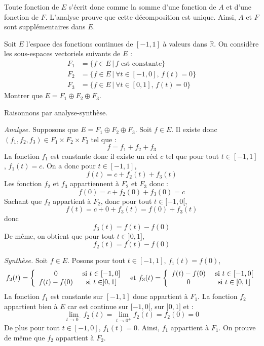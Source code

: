 \documentclass[a4paper,10pt]{report}
\begin{document}
\medskip

\noindent Toute fonction de $E$ s'écrit donc comme la somme d'une fonction de $A$ et d'une fonction de $F$. L'analyse prouve que cette décomposition est unique. Ainsi, $A$ et $F$ sont supplémentaires dans $E$.

\medskip



\begin{Exercice}{} Soit $E$ l'espace des fonctions continues de $[-1,1]$ à valeurs dans $\mathbb{R}$. On considère les sous-espaces vectoriels suivants de $E$ :
\begin{align*}
F_1 &= \lbrace f \in E \, \vert \, f{\text{~est constante}} \rbrace \\
F_2 &= \lbrace f \in E \, \vert \ \forall t \in [ - 1,0], \,  f(t)  = 0 \rbrace \\
F_3 & = \lbrace f \in E \, \vert \ \forall t \in [0,1], \,  f(t) = 0 \rbrace 
\end{align*}
Montrer que $E = F_1 \oplus F_2 \oplus F_3$.
\end{Exercice} 

\corr Raisonnons par analyse-synthèse.

\medskip

\noindent \textit{Analyse.} Supposons que $E = F_1 \oplus F_2 \oplus F_3$. Soit $f \in E$. Il existe donc $(f_1,f_2,f_3) \in F_1 \times F_2 \times F_3$ tel que :
$$ f = f_1+ f_2+ f_3$$
La fonction $f_1$ est constante donc il existe un réel $c$ tel que pour tout $t \in [-1,1]$, $f_1(t)=c$. On a donc pour $t \in [-1,1]$,
$$ f(t) = c + f_2(t) + f_3(t)$$
Les fonction $f_2$ et $f_3$ appartiennent à $F_2$ et $F_3$ donc :
$$ f(0) = c + f_2(0)+ f_3(0) = c$$
Sachant que $f_2$ appartient à $F_2$, donc pour tout $t \in [-1,0[$,
$$f(t) = c + 0 + f_3(t) = f(0)+ f_3(t)$$
donc 
$$ f_3(t) = f(t)- f(0)$$
De même, on obtient que pour tout $t \in ]0,1]$,
$$ f_2(t) = f(t)-f(0)$$

\medskip

\noindent \textit{Synthèse.} Soit $f \in E$. Posons pour tout $t \in [-1,1]$, $f_1(t) = f(0)$, 
$$ f_2(t) = \left\lbrace \begin{array}{ccl}
0 & \hbox{ si } t \in [-1,0] \\
f(t)-f(0) & \hbox{ si } t \in ]0,1]
\end{array}\right. \; \hbox{ et } f_3(t) = \left\lbrace \begin{array}{ccl}
f(t)-f(0) & \hbox{ si } t \in [-1,0[ \\
0 & \hbox{ si } t \in [0,1]
\end{array}\right.$$
La fonction $f_1$ est constante sur $[-1,1]$ donc appartient à $F_1$. La fonction $f_2$ appartient bien à $E$ car est continue sur $[-1,0[$, sur $]0,1]$ et :
$$ \lim_{t \rightarrow 0^{-}} f_2(t) =  \lim_{t \rightarrow 0^{+}} f_2(t) = f_2(0) = 0$$
De plus pour tout $t \in [-1,0]$, $f_1(t)=0$. Ainsi, $f_1$ appartient à $F_1$. On prouve de même que $f_2$ appartient à $F_2$. 
\end{document}
